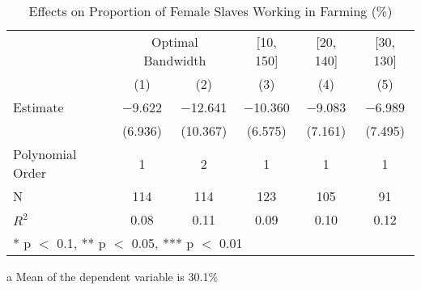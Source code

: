 \begin{table}[!h]

\caption{Effects on Proportion of Female Slaves Working in Farming (\%) \label{tab:rdd_women_enslaved_farming}}
\centering
\begin{threeparttable}
\begin{tabular}[t]{lccccc}
\toprule
\multicolumn{1}{c}{} & \multicolumn{2}{c}{Optimal Bandwidth} & \multicolumn{1}{c}{[10, 150]} & \multicolumn{1}{c}{[20, 140]} & \multicolumn{1}{c}{[30, 130]} \\
\cmidrule(l{3pt}r{3pt}){2-3} \cmidrule(l{3pt}r{3pt}){4-4} \cmidrule(l{3pt}r{3pt}){5-5} \cmidrule(l{3pt}r{3pt}){6-6}
  & (1) & (2) & (3) & (4) & (5)\\
\midrule
Estimate & \num{-9.622} & \num{-12.641} & \num{-10.360} & \num{-9.083} & \num{-6.989}\\
 & (\num{6.936}) & (\num{10.367}) & (\num{6.575}) & (\num{7.161}) & (\num{7.495})\\

\midrule
Polynomial Order & 1 & 2 & 1 & 1 & 1\\
N & \num{114} & \num{114} & \num{123} & \num{105} & \num{91}\\
$R^2$ & \num{0.08} & \num{0.11} & \num{0.09} & \num{0.10} & \num{0.12}\\
\bottomrule
\multicolumn{6}{l}{\rule{0pt}{1em}* p $<$ 0.1, ** p $<$ 0.05, *** p $<$ 0.01}\\
\end{tabular}
\begin{tablenotes}
\item[a] Mean of the dependent variable is 30.1\%
\end{tablenotes}
\end{threeparttable}
\end{table}
